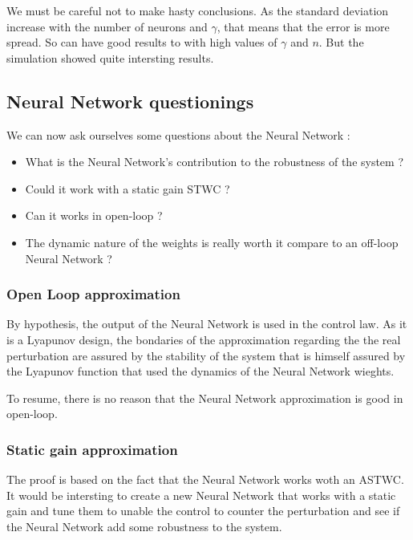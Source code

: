 We must be careful not to make hasty conclusions. As the standard deviation increase with the %
number of neurons and \(\gamma\), that means that the error is more spread. So can have good %
results to with high values of \(\gamma\) and \(n\). But  the simulation showed quite %
intersting results.

\subsection{Neural Network questionings}

We can now ask ourselves some questions about the Neural Network : 

\begin{itemize}
    \item What is the Neural Network's contribution to the robustness of the system ?
    \item Could it work with a static gain STWC ?
    \item Can it works in open-loop ? 
    \item The dynamic nature of the weights is really worth it compare to an off-loop Neural Network ?
\end{itemize}

\subsubsection{Open Loop approximation}

By hypothesis, the output of the Neural Network is used in the control law. %
As it is a Lyapunov design, the bondaries of the approximation regarding the %
the real perturbation are assured by the stability of the system that is himself %
assured by the Lyapunov function that used the dynamics of the Neural Network wieghts. %

To resume, there is no reason that the Neural Network approximation is good in open-loop. %

\subsubsection{Static gain approximation}

The proof is based on the fact that the Neural Network works woth an ASTWC. It would be intersting %
to create a new Neural Network that works with a static gain and tune them to unable the control %
to counter the perturbation and see if the Neural Network add some robustness to the system. %

